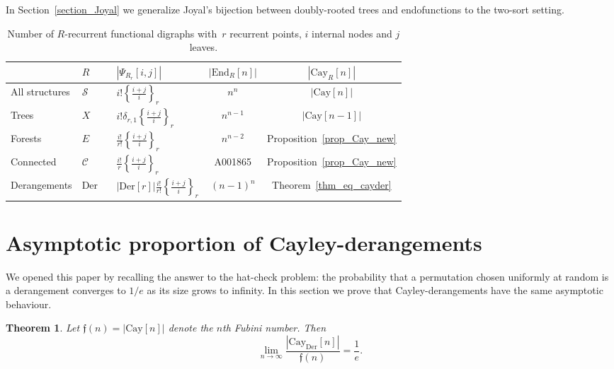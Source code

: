 \documentclass[a4paper,11pt,UKenglish]{article}
\newcommand{\Set}{E}
\newcommand{\Sym}{\mathcal{S}}
\newcommand{\End}{\mathrm{End}}
\newcommand{\Cyc}{\mathcal{C}}
\newcommand{\Der}{\mathrm{Der}}
\newcommand{\Cay}{\mathrm{Cay}}
\newcommand{\sdiff}[3]{\genfrac{\{}{\}}{}{}{{#1}}{{#2}}_{{#3}}}
\newcommand{\fub}[1]{\mathfrak{f}(#1)}
\newcommand{\CayDer}{\Cay_{\Der}}
\newtheorem{theorem}{Theorem}[section]
\theoremstyle{definition}
\begin{document}
In Section~\ref{section_Joyal} we generalize Joyal's bijection
between doubly-rooted trees and endofunctions to the two-sort
setting.

\begin{table}
\centering
\renewcommand{\arraystretch}{1.7}
\begin{tabular}{lllcc}
                 & $R$~~~ & $|\Psi_{R_r}[i,j]|$                    & $|\End_R[n]|$     & $|\Cay_R[n]|$ \\
\toprule
All structures   & $\Sym$ & $i!\sdiff{i+j}{i}{r}$                      & $n^n$             & $|\Cay[n]|$ \\
Trees            & $X$    & $i!\delta_{r,1}\sdiff{i+j}{i}{r}$          & $n^{n-1}$         & $|\Cay[n-1]|$ \\
Forests          & $\Set$ & $\frac{i!}{r!}\sdiff{i+j}{i}{r}$           & $n^{n-2}$         & Proposition~\ref{prop_Cay_new} \\
Connected        & $\Cyc$ & $\frac{i!}{r}\sdiff{i+j}{i}{r}$            & A001865           & Proposition~\ref{prop_Cay_new} \\
Derangements     & $\Der$ & $|\Der[r]|\frac{i!}{r!}\sdiff{i+j}{i}{r}$  & $(n-1)^n$         & Theorem~\ref{thm_eq_cayder} \\
\end{tabular}
\caption{Number of $R$-recurrent functional digraphs with~$r$
recurrent points, $i$ internal nodes and $j$ leaves.
}\label{table_formulas}
\end{table}

\section{Asymptotic proportion of Cayley-derangements}\label{section_asymp}

We opened this paper by recalling the answer to the hat-check
problem: the probability that a permutation chosen uniformly at
random is a derangement converges to $1/e$ as its size grows to
infinity. In this section we prove that Cayley-derangements have the
same asymptotic behaviour.

\begin{theorem}\label{main-theorem}
Let $\fub{n} = |\Cay[n]|$ denote the $n$th Fubini number. Then
\[
  \lim_{n\to\infty} \frac{|\CayDer[n]|}{\fub{n}} = \frac{1}{e}.
\]
\end{theorem}
\end{document}
